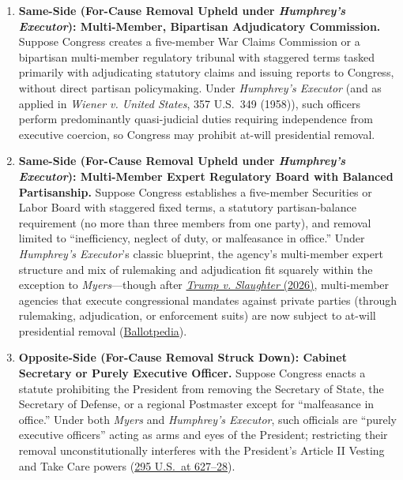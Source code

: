 \documentclass[12pt]{article}
\begin{document}
\begin{enumerate}
    \item \textbf{Same-Side (For-Cause Removal Upheld under \textit{Humphrey's Executor}): Multi-Member, Bipartisan Adjudicatory Commission.} Suppose Congress creates a five-member War Claims Commission or a bipartisan multi-member regulatory tribunal with staggered terms tasked primarily with adjudicating statutory claims and issuing reports to Congress, without direct partisan policymaking. Under \textit{Humphrey's Executor} (and as applied in \textit{Wiener v. United States}, 357 U.S.\ 349 (1958)), such officers perform predominantly quasi-judicial duties requiring independence from executive coercion, so Congress may prohibit at-will presidential removal.

    \item \textbf{Same-Side (For-Cause Removal Upheld under \textit{Humphrey's Executor}): Multi-Member Expert Regulatory Board with Balanced Partisanship.} Suppose Congress establishes a five-member Securities or Labor Board with staggered fixed terms, a statutory partisan-balance requirement (no more than three members from one party), and removal limited to ``inefficiency, neglect of duty, or malfeasance in office.'' Under \textit{Humphrey's Executor}'s classic blueprint, the agency's multi-member expert structure and mix of rulemaking and adjudication fit squarely within the exception to \textit{Myers}---though after \href{https://supreme.justia.com/cases/federal/us/609/25-332/}{\textit{Trump v. Slaughter} (2026)}, multi-member agencies that execute congressional mandates against private parties (through rulemaking, adjudication, or enforcement suits) are now subject to at-will presidential removal (\href{https://ballotpedia.org/Humphrey\%27s_Executor_v._United_States}{Ballotpedia}).

    \item \textbf{Opposite-Side (For-Cause Removal Struck Down): Cabinet Secretary or Purely Executive Officer.} Suppose Congress enacts a statute prohibiting the President from removing the Secretary of State, the Secretary of Defense, or a regional Postmaster except for ``malfeasance in office.'' Under both \textit{Myers} and \textit{Humphrey's Executor}, such officials are ``purely executive officers'' acting as arms and eyes of the President; restricting their removal unconstitutionally interferes with the President's Article II Vesting and Take Care powers (\href{https://supreme.justia.com/cases/federal/us/295/602/}{295 U.S.\ at 627--28}).


\end{enumerate}
\end{document}
